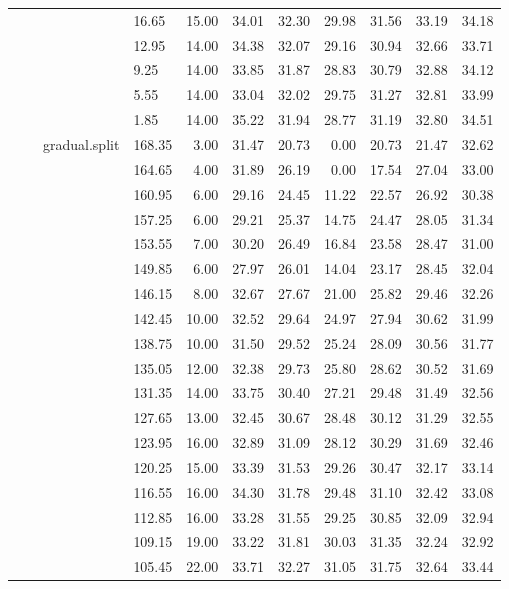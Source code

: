 \begin{longtable}{llllrrrrrrr}
   &  &  & 16.65 & 15.00 & 34.01 & 32.30 & 29.98 & 31.56 & 33.19 & 34.18 \\ 
   &  &  & 12.95 & 14.00 & 34.38 & 32.07 & 29.16 & 30.94 & 32.66 & 33.71 \\ 
   &  &  & 9.25 & 14.00 & 33.85 & 31.87 & 28.83 & 30.79 & 32.88 & 34.12 \\ 
   &  &  & 5.55 & 14.00 & 33.04 & 32.02 & 29.75 & 31.27 & 32.81 & 33.99 \\ 
   &  &  & 1.85 & 14.00 & 35.22 & 31.94 & 28.77 & 31.19 & 32.80 & 34.51 \\ 
   &  & gradual.split & 168.35 & 3.00 & 31.47 & 20.73 & 0.00 & 20.73 & 21.47 & 32.62 \\ 
   &  &  & 164.65 & 4.00 & 31.89 & 26.19 & 0.00 & 17.54 & 27.04 & 33.00 \\ 
   &  &  & 160.95 & 6.00 & 29.16 & 24.45 & 11.22 & 22.57 & 26.92 & 30.38 \\ 
   &  &  & 157.25 & 6.00 & 29.21 & 25.37 & 14.75 & 24.47 & 28.05 & 31.34 \\ 
   &  &  & 153.55 & 7.00 & 30.20 & 26.49 & 16.84 & 23.58 & 28.47 & 31.00 \\ 
   &  &  & 149.85 & 6.00 & 27.97 & 26.01 & 14.04 & 23.17 & 28.45 & 32.04 \\ 
   &  &  & 146.15 & 8.00 & 32.67 & 27.67 & 21.00 & 25.82 & 29.46 & 32.26 \\ 
   &  &  & 142.45 & 10.00 & 32.52 & 29.64 & 24.97 & 27.94 & 30.62 & 31.99 \\ 
   &  &  & 138.75 & 10.00 & 31.50 & 29.52 & 25.24 & 28.09 & 30.56 & 31.77 \\ 
   &  &  & 135.05 & 12.00 & 32.38 & 29.73 & 25.80 & 28.62 & 30.52 & 31.69 \\ 
   &  &  & 131.35 & 14.00 & 33.75 & 30.40 & 27.21 & 29.48 & 31.49 & 32.56 \\ 
   &  &  & 127.65 & 13.00 & 32.45 & 30.67 & 28.48 & 30.12 & 31.29 & 32.55 \\ 
   &  &  & 123.95 & 16.00 & 32.89 & 31.09 & 28.12 & 30.29 & 31.69 & 32.46 \\ 
   &  &  & 120.25 & 15.00 & 33.39 & 31.53 & 29.26 & 30.47 & 32.17 & 33.14 \\ 
   &  &  & 116.55 & 16.00 & 34.30 & 31.78 & 29.48 & 31.10 & 32.42 & 33.08 \\ 
   &  &  & 112.85 & 16.00 & 33.28 & 31.55 & 29.25 & 30.85 & 32.09 & 32.94 \\ 
   &  &  & 109.15 & 19.00 & 33.22 & 31.81 & 30.03 & 31.35 & 32.24 & 32.92 \\ 
   &  &  & 105.45 & 22.00 & 33.71 & 32.27 & 31.05 & 31.75 & 32.64 & 33.44 \\ 

\end{longtable}
